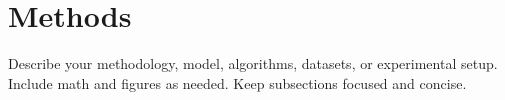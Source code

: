 \section{Methods}\label{sec2}
Describe your methodology, model, algorithms, datasets, or experimental setup. Include math and figures as needed. Keep subsections focused and concise.
